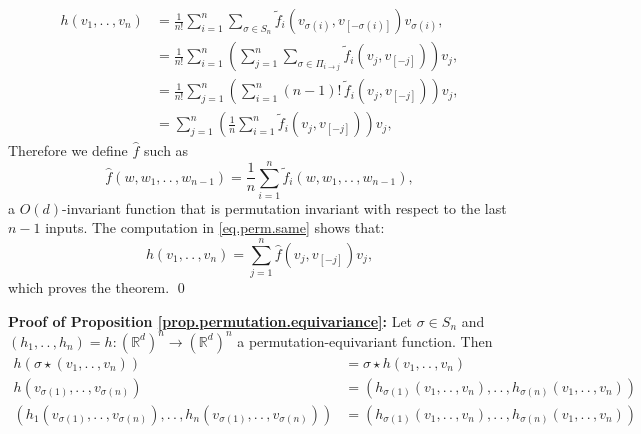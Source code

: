 \documentclass{article}
\renewcommand{\paragraph}[1]{\par\textbf{#1}}
\theoremstyle{Hogg}
\renewcommand{\ldots}{.\,.\,}
\begin{document}
\begin{align}
     h(v_1, \ldots,  v_n) &= \frac{1}{n!} \sum_{i=1}^n \sum_{\sigma \in S_n} \tilde f_i(v_{\sigma(i)}, v_{[-\sigma(i)]}) v_{\sigma(i)},
     \\
     & = \frac{1}{n!} \sum_{i=1}^n \left(\sum_{j=1}^n \sum_{\sigma \in \Pi_{i\to j}} \tilde f_i(v_j, v_{[-j]}) \right) v_{j},
     \\
     & = \frac{1}{n!}\sum_{j=1}^n \left(\sum_{i=1}^n (n-1)! \, \tilde f_i(v_j, v_{[-j]}) \right) v_{j}, \\
     & = \sum_{j=1}^n \left( \frac{1}{n}\sum_{i=1}^n \tilde f_i(v_j, v_{[-j]}) \right) v_{j}, \label{eq.perm.same}
\end{align}
Therefore we define $\hat f$ such as
\begin{equation}
    \hat f(w, w_1,\ldots, w_{n-1}) = \frac{1}{n} \sum_{i=1}^n \tilde f_{i}(w, w_1,\ldots, w_{n-1}),
\end{equation}
a $O(d)$-invariant function that is permutation invariant with respect to the last $n-1$ inputs. The computation in \eqref{eq.perm.same} shows that: 
\begin{equation}
h(v_1, \ldots,  v_n) =
   \sum_{j=1}^n  \hat f(v_j, v_{[-j]}) v_{j},
\end{equation}
which proves the theorem. \qed


\paragraph{Proof of Proposition \ref{prop.permutation.equivariance}:}
Let $\sigma \in S_n$ and $(h_1,\ldots, h_n)=h:(\mathbb R^d)^n\to (\mathbb R^d)^n$ a  permutation-equivariant function. Then 
\begin{align}
h(\sigma\star (v_1, \ldots, v_n)) &= 
\sigma \star h(v_1,\ldots, v_n) \\
h(v_{\sigma(1)}, \ldots, v_{\sigma(n)})&=
(h_{\sigma(1)}(v_1,\ldots, v_n), \ldots, h_{\sigma(n)}(v_1,\ldots, v_n) ) \\
(h_1 (v_{\sigma(1)}, \ldots, v_{\sigma(n)}), \ldots, h_n(v_{\sigma(1)}, \ldots, v_{\sigma(n)}) ) &=
(h_{\sigma(1)}(v_1,\ldots, v_n), \ldots, h_{\sigma(n)}(v_1,\ldots, v_n) ) \label{eq.equiv}
\end{align}
\end{document}
